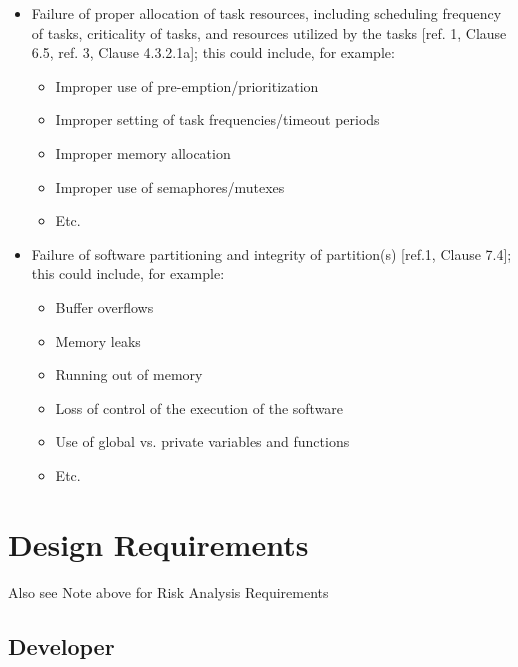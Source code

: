 \documentclass[12pt]{../Common_files/ElisaPaper}
\begin{document}
\begin{itemize}

\item Failure of proper allocation of task resources, including scheduling frequency of tasks, criticality of tasks, and resources utilized by the tasks [ref. 1, Clause 6.5, ref. 3, Clause 4.3.2.1a]; this could include, for example:

\begin{itemize}

\item Improper use of pre-emption/prioritization
\item Improper setting of task frequencies/timeout periods
\item Improper memory allocation
\item Improper use of semaphores/mutexes
\item Etc.

\end{itemize}

\item Failure of software partitioning and integrity of partition(s) [ref.1, Clause 7.4]; this could include, for example:

\begin{itemize}

\item Buffer overflows
\item Memory leaks
\item Running out of memory
\item Loss of control of the execution of the software
\item Use of global vs. private variables and functions
\item Etc.

\end{itemize}

\end{itemize}
 
\section{Design Requirements}

Also see Note above for Risk Analysis Requirements

\subsection{Developer}
\end{document}
